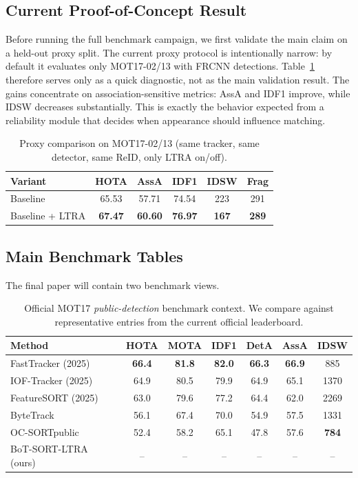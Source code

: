 \subsection{Current Proof-of-Concept Result}
Before running the full benchmark campaign, we first validate the main claim on a held-out proxy split. The current proxy protocol is intentionally narrow: by default it evaluates only MOT17-02/13 with FRCNN detections. Table~\ref{tab:proxy_ltra} therefore serves only as a quick diagnostic, not as the main validation result. The gains concentrate on association-sensitive metrics: AssA and IDF1 improve, while IDSW decreases substantially. This is exactly the behavior expected from a reliability module that decides when appearance should influence matching.

\begin{table}[t]
\centering
\caption{Proxy comparison on MOT17-02/13 (same tracker, same detector, same ReID, only LTRA on/off).}
\label{tab:proxy_ltra}
\begin{tabular}{lccccc}
\toprule
Variant & HOTA & AssA & IDF1 & IDSW & Frag \\
\midrule
Baseline & 65.53 & 57.71 & 74.54 & 223 & 291 \\
Baseline + LTRA & \textbf{67.47} & \textbf{60.60} & \textbf{76.97} & \textbf{167} & \textbf{289} \\
\bottomrule
\end{tabular}
\end{table}

\subsection{Main Benchmark Tables}
The final paper will contain two benchmark views.

\begin{table}[t]
\centering
\caption{Official MOT17 \emph{public-detection} benchmark context. We compare against representative entries from the current official leaderboard.}
\label{tab:mot17_context}
\begin{tabular}{lcccccc}
\toprule
Method & HOTA & MOTA & IDF1 & DetA & AssA & IDSW \\
\midrule
FastTracker (2025) & \textbf{66.4} & \textbf{81.8} & \textbf{82.0} & \textbf{66.3} & \textbf{66.9} & 885 \\
IOF-Tracker (2025) & 64.9 & 80.5 & 79.9 & 64.9 & 65.1 & 1370 \\
FeatureSORT (2025) & 63.0 & 79.6 & 77.2 & 64.4 & 62.0 & 2269 \\
ByteTrack \cite{zhang2021bytetrack} & 56.1 & 67.4 & 70.0 & 54.9 & 57.5 & 1331 \\
OC-SORTpublic \cite{cao2022ocsort} & 52.4 & 58.2 & 65.1 & 47.8 & 57.6 & \textbf{784} \\
BoT-SORT-LTRA (ours) & -- & -- & -- & -- & -- & -- \\
\bottomrule
\end{tabular}
\end{table}

